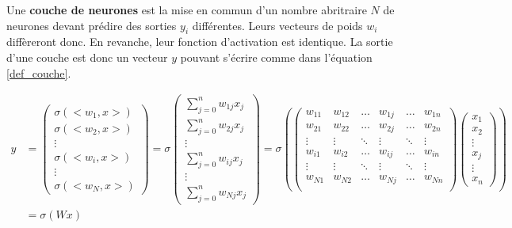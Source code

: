 \documentclass[12pt, french]{report}
\begin{document}
Une \textbf{couche de neurones} est la mise en commun d'un nombre abritraire $N$ de neurones devant prédire des sorties $y_i$ différentes. Leurs vecteurs de poids $w_i$ diffèreront donc. En revanche, leur fonction d'activation est identique. La sortie d'une couche est donc un vecteur $y$ pouvant s'écrire comme dans l'équation \ref{def_couche}.

\begin{equation} \label{def_couche}
    \begin{split}
        y & =
        \left(\begin{matrix}
            \sigma(<w_1, x>) \\
            \sigma(<w_2, x>) \\
            \vdots \\
            \sigma(<w_i, x>) \\
            \vdots \\
            \sigma(<w_N, x>)
        \end{matrix}\right)
        =
        \sigma\left(\begin{matrix}
            \sum_{j=0}^{n} w_{1j}x_j \\
            \sum_{j=0}^{n} w_{2j}x_j \\
            \vdots \\
            \sum_{j=0}^{n} w_{ij}x_j \\
            \vdots \\
            \sum_{j=0}^{n} w_{Nj}x_j
        \end{matrix}\right)
        = \sigma\left(
            \left(\begin{matrix}
                w_{11} & w_{12} & \hdots & w_{1j} & \hdots & w_{1n} \\
                w_{21} & w_{22} & \hdots & w_{2j} & \hdots & w_{2n} \\
                \vdots & \vdots & \ddots & \vdots & \ddots & \vdots \\
                w_{i1} & w_{i2} & \hdots & w_{ij} & \hdots & w_{in} \\
                \vdots & \vdots & \ddots & \vdots & \ddots & \vdots \\
                w_{N1} & w_{N2} & \hdots & w_{Nj} & \hdots & w_{Nn} \\
            \end{matrix}\right)
            \left(\begin{matrix}
                x_1 \\ x_2 \\ \vdots \\ x_j \\ \vdots \\ x_n
            \end{matrix}\right)
        \right) \\
        & = \sigma(Wx)
    \end{split}
\end{equation}
\end{document}
